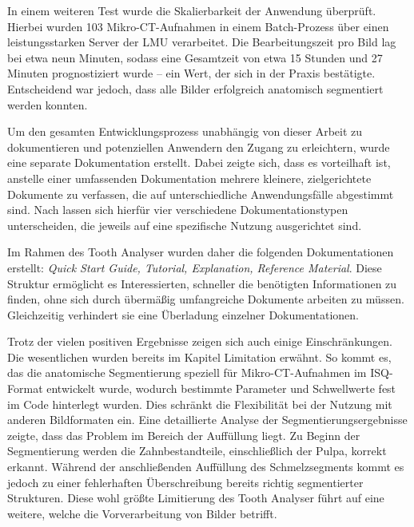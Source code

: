 In einem weiteren Test wurde die Skalierbarkeit der Anwendung überprüft. Hierbei
wurden 103 Mikro-\ac{CT}-Aufnahmen in einem Batch-Prozess über einen
leistungsstarken Server der LMU verarbeitet. Die Bearbeitungszeit pro Bild lag bei
etwa neun Minuten, sodass eine Gesamtzeit von etwa 15 Stunden und 27 Minuten
prognostiziert wurde – ein Wert, der sich in der Praxis bestätigte. Entscheidend
war jedoch, dass alle Bilder erfolgreich anatomisch segmentiert werden konnten.

Um den gesamten Entwicklungsprozess unabhängig von dieser Arbeit zu dokumentieren
und potenziellen Anwendern den Zugang zu erleichtern, wurde eine separate
Dokumentation erstellt. Dabei zeigte sich, dass es vorteilhaft ist, anstelle einer
umfassenden Dokumentation mehrere kleinere, zielgerichtete Dokumente zu
verfassen, die auf unterschiedliche Anwendungsfälle abgestimmt sind. Nach \citet{procida2017}
lassen sich hierfür vier verschiedene Dokumentationstypen unterscheiden, die
jeweils auf eine spezifische Nutzung ausgerichtet sind.

Im Rahmen des Tooth Analyser wurden daher die folgenden Dokumentationen erstellt:
\textit{Quick Start Guide, Tutorial, Explanation, Reference Material}. Diese Struktur
ermöglicht es Interessierten, schneller die benötigten Informationen zu finden, ohne
sich durch übermäßig umfangreiche Dokumente arbeiten zu müssen. Gleichzeitig
verhindert sie eine Überladung einzelner Dokumentationen.

Trotz der vielen positiven Ergebnisse zeigen sich auch einige Einschränkungen. Die
wesentlichen wurden bereits im Kapitel Limitation erwähnt. So kommt es, das die anatomische
Segmentierung speziell für Mikro-\ac{CT}-Aufnahmen im \ac{ISQ}-Format entwickelt
wurde, wodurch bestimmte Parameter und Schwellwerte fest im Code hinterlegt
wurden. Dies schränkt die Flexibilität bei der Nutzung mit anderen Bildformaten ein.
Eine detaillierte Analyse der Segmentierungsergebnisse zeigte, dass das Problem im
Bereich der Auffüllung liegt. Zu Beginn der Segmentierung werden die
Zahnbestandteile, einschließlich der Pulpa, korrekt erkannt. Während der anschließenden
Auffüllung des Schmelzsegments kommt es jedoch zu einer fehlerhaften Überschreibung
bereits richtig segmentierter Strukturen. Diese wohl größte Limitierung des
Tooth Analyser führt auf eine weitere, welche die Vorverarbeitung von Bilder betrifft.

